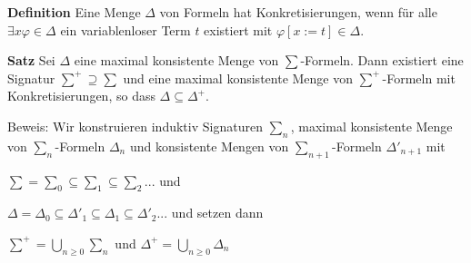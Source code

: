 \documentclass[a4paper]{article}
\renewcommand{\note}[2]{\begin{noteBox} \textbf{#1} #2 \end{noteBox}}
\begin{document}
\begin{multicols}{3}
  \note{Definition}{Eine Menge $\Delta$ von Formeln hat Konkretisierungen, wenn für alle $\exists x\varphi\in\Delta$ ein variablenloser Term $t$ existiert mit $\varphi[x:=t]\in\Delta$.}

  \note{Satz}{Sei $\Delta$ eine maximal konsistente Menge von $\sum$-Formeln. Dann existiert eine Signatur $\sum^+ \supseteq\sum$ und eine maximal konsistente Menge von $\sum^+$-Formeln mit Konkretisierungen, so dass $\Delta\subseteq\Delta^+$.}

  Beweis: Wir konstruieren induktiv Signaturen $\sum_n$, maximal konsistente Menge von $\sum_n$-Formeln $\Delta_n$ und konsistente Mengen von $\sum_{n+1}$-Formeln $\Delta'_{n+1}$ mit
  \begin{itemize*}
    \item $\sum =\sum_0 \subseteq\sum_1 \subseteq\sum_2...$ und
    \item $\Delta = \Delta_0 \subseteq \Delta'_1 \subseteq\Delta_1 \subseteq\Delta'_2...$
    und setzen dann
    \item $\sum^+ =\bigcup_{n\geq 0} \sum_n$ und $\Delta^+ = \bigcup_{n\geq 0} \Delta_n$
  \end{itemize*}


\end{multicols}
\end{document}
